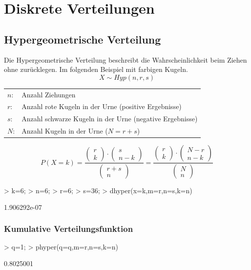 \section{Diskrete Verteilungen}

\subsection{Hypergeometrische Verteilung}
Die Hypergeometrische Verteilung beschreibt die Wahrscheinlichkeit beim 
Ziehen ohne zurücklegen. Im folgenden Beispiel mit farbigen Kugeln. 
\[ X \sim Hyp(n, r, s) \]
\begin{tabular}{@{}ll}
  $n$: & Anzahl Ziehungen \\
  $r$: & Anzahl rote Kugeln in der Urne (positive Ergebnisse) \\
  $s$: & Anzahl schwarze Kugeln in der Urne (negative Ergebnisse) \\
  $N$: & Anzahl Kugeln in der Urne ($N = r + s$)
\end{tabular}
\[ P(X=k) 
= \frac{\left( \begin{array}{c}r\\k\end{array} \right) \cdot 
\left( \begin{array}{c}s\\n-k\end{array} \right)}
{\left( \begin{array}{c}r+s\\n\end{array} \right)} 
= \frac{\left( \begin{array}{c}r\\k\end{array} \right) \cdot 
\left( \begin{array}{c}N-r\\n-k\end{array} \right)}
{\left( \begin{array}{c}N\\n\end{array} \right)} \]
\begin{Schunk}
\begin{Sinput}
> k=6;
> n=6;
> r=6;
> s=36;
> dhyper(x=k,m=r,n=s,k=n)
\end{Sinput}
\begin{Soutput}
[1] 1.906292e-07
\end{Soutput}
\end{Schunk}
\subsubsection{Kumulative Verteilungsfunktion}
\begin{Schunk}
\begin{Sinput}
> q=1;
> phyper(q=q,m=r,n=s,k=n)
\end{Sinput}
\begin{Soutput}
[1] 0.8025001
\end{Soutput}
\end{Schunk}

